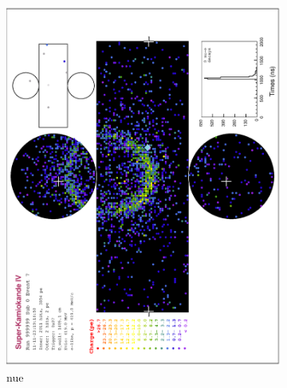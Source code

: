     \begin{figure}
          \centering
          \begin{subfigure}[b]{\dbfigwid\textwidth}
               \centering
               \includegraphics[width=\dbfigwid\textwidth]{figures/t2k/sk-nue.eps}
               \caption{nue}
               \label{subfig:sk-nue}
          \end{subfigure}
          \begin{subfigure}[b]{\dbfigwid\textwidth}
               \centering

\end{subfigure}
\end{figure}
